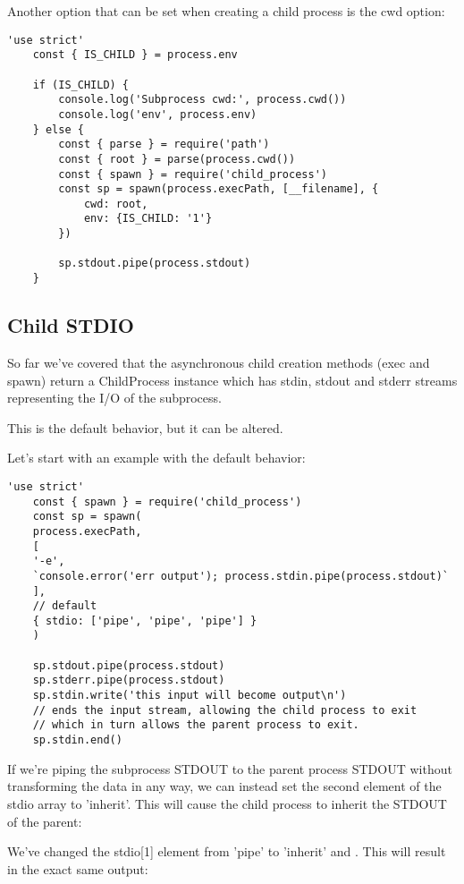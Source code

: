 \documentclass{scrartcl}
\begin{document}
Another option that can be set when creating a child process is the cwd option:

\begin{lstlisting}[style=ES6]
    'use strict'
    const { IS_CHILD } = process.env

    if (IS_CHILD) {
        console.log('Subprocess cwd:', process.cwd())
        console.log('env', process.env)
    } else {
        const { parse } = require('path')
        const { root } = parse(process.cwd())
        const { spawn } = require('child_process')
        const sp = spawn(process.execPath, [__filename], {
            cwd: root,
            env: {IS_CHILD: '1'}
        })

        sp.stdout.pipe(process.stdout)
    }
\end{lstlisting}

\subsection{Child STDIO}

So far we've covered that the asynchronous child creation methods (exec and spawn) return a ChildProcess instance which has stdin, stdout and stderr streams representing the I/O of the subprocess.

This is the default behavior, but it can be altered.

Let's start with an example with the default behavior:

\begin{lstlisting}[style=ES6]
    'use strict'
    const { spawn } = require('child_process')
    const sp = spawn(
    process.execPath,
    [
    '-e',
    `console.error('err output'); process.stdin.pipe(process.stdout)`
    ],
    // default
    { stdio: ['pipe', 'pipe', 'pipe'] }
    )

    sp.stdout.pipe(process.stdout)
    sp.stderr.pipe(process.stdout)
    sp.stdin.write('this input will become output\n')
    // ends the input stream, allowing the child process to exit
    // which in turn allows the parent process to exit.
    sp.stdin.end()
\end{lstlisting}

If we're piping the subprocess STDOUT to the parent process STDOUT without transforming the data in any way, we can instead set the second element of the stdio array to 'inherit'. This will cause the child process to inherit the STDOUT of the parent:


We've changed the stdio[1] element from 'pipe' to 'inherit' and . This will result in the exact same output:
\end{document}
